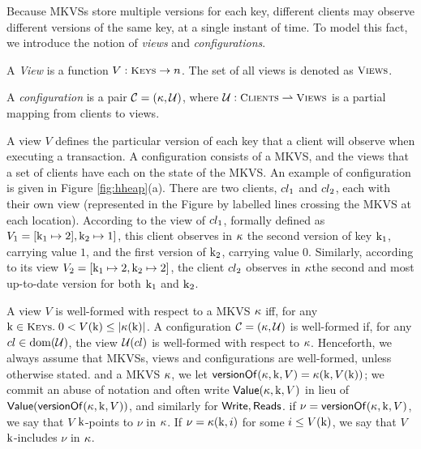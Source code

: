 Because MKVSs store multiple versions for each key, different clients may 
observe different versions of the same key, at a single instant of time. 
To model this fact, we introduce the notion of \emph{views} and \emph{configurations}. 
\begin{definition}
\label{def:view}
A \emph{View} is a function $V: \Addr \rightarrow \nat$. 
The set of all views is denoted as $\viewSet$. 

A \emph{configuration} is a pair $\mathcal{C} = (\kappa, \mathcal{U})$, where 
$\viewFun: \tidset \rightharpoonup \viewSet$ is a partial mapping 
from clients to views. 
\end{definition}
A view $V$ defines the particular version of each key that a client 
will observe when executing a transaction. A configuration consists 
of a MKVS, and the views that a set of clients have each on the state 
of the MKVS. An example of configuration is given in Figure \ref{fig:hheap}(a). 
There are two clients, $cl_1$ and $cl_2$, each with their own view 
(represented in the Figure by labelled lines crossing the MKVS at each location). 
According to the view of $cl_1$, formally defined as $V_1 = [\mathrm{k}_1 \mapsto 2], 
\mathrm{k}_2 \mapsto 1]$, this client observes in $\kappa$ the second version of key $\mathrm{k}_1$, carrying 
value $1$, and 
the first version of $\mathrm{k}_2$, carrying value $0$. Similarly, according to its view 
$V_2 = [\mathrm{k}_1 \mapsto 2, \mathrm{k}_2 \mapsto 2]$, the client $cl_2$ observes 
in $\kappa$the second and most up-to-date version for both $\mathrm{k}_1$ and $\mathrm{k}_2$.

A view $V$ is well-formed with respect to a MKVS $\kappa$ iff, 
for any $\key{k} \in \Addr.\; 0 < V(\key{k}) \leq \lvert \hh(\key{k}) \rvert$. 
A configuration $\mathcal{C} = (\kappa, \mathcal{U})$ is well-formed if, for any 
$cl \in \operatorname{dom}(\mathcal{U})$, the view $\mathcal{U}(cl)$ is well-formed with respect 
to $\kappa$. Henceforth, we always assume that MKVSs, views and configurations are well-formed, 
unless otherwise stated.
and a MKVS $\kappa$, we let $\mathsf{versionOf}(\kappa, \mathrm{k}, V) = 
\kappa(\mathrm{k}, V(\mathrm{k}))$; we commit an abuse of notation and 
often write $\mathsf{Value}(\kappa, \mathrm{k}, V)$ in lieu of $
\mathsf{Value}(\mathsf{versionOf}(\kappa, \mathrm{k}, V))$, and similarly for $\mathsf{Write}, \mathsf{Reads}$.
if $\nu = \mathsf{versionOf}(\kappa, \mathrm{k}, V)$,  
we say that $V$ $\mathrm{k}$-points to $\nu$ in $\kappa$. If $\nu = \kappa(\mathrm{k}, i)$ 
for some $i \leq V(\mathrm{k})$, we say that $V$ $\mathrm{k}$-includes $\nu$ in $\kappa$.

